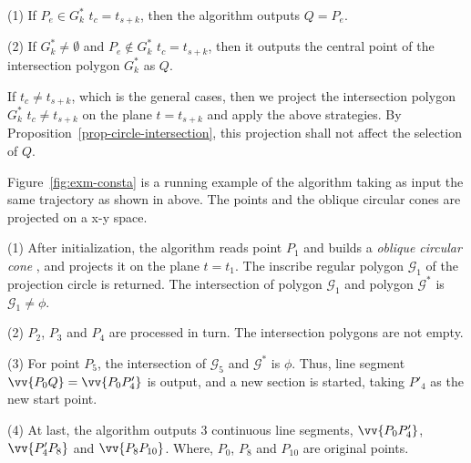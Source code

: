 \sstab (1) If $P_e \in G^*_k$ \wrt $t_c=t_{s+k}$, then the algorithm outputs $Q=P_e$.

\sstab (2) If $G^*_k \ne \emptyset$ and $P_e \not\in G^*_k$ \wrt $t_c=t_{s+k}$, then it outputs the central point of the intersection polygon $G^*_k$ as $Q$.

  If $t_c \ne t_{s+k}$, which is the general cases, then we project the intersection polygon $G^*_k$ \wrt $t_c \ne t_{s+k}$ on the plane $t=t_{s+k}$ and apply the above strategies. By Proposition~\ref{prop-circle-intersection}, this projection shall not affect the selection of $Q$.

\begin{example}
\label{exm-alg-conesta}
Figure~\ref{fig:exm-consta} is a running example of the \cista algorithm taking as input the same trajectory as shown in above.
The points and the oblique circular cones are projected on a x-y space.

\ni (1) After initialization, the \cista algorithm reads point $P_1$ and builds a \emph{oblique circular cone} , and projects it on the plane $t=t_1$. The inscribe regular polygon $\mathcal{G}_1$ of the projection circle is returned. The intersection of polygon $\mathcal{G}_1$ and polygon $\mathcal{G}^*$ is $\mathcal{G}_1 \ne \phi$.

\ni (2) $P_2$, $P_3$ and $P_4$ are processed in turn. The intersection polygons are not empty.

\ni (3) For point $P_5$, the intersection of $\mathcal{G}_5$ and $\mathcal{G}^*$ is $\phi$. Thus, line segment $\vv{P_0Q} =\vv{P_0P'_4}$ is output, and a new section is started, taking $P'_4$ as the new start point.

\ni (4) At last, the algorithm outputs 3 continuous line segments, \ie $\vv{P_0P'_4}$, $\vv{P'_4P_8}$ and $\vv{P_8P_{10}}$. Where, $P_0$, $P_8$ and $P_{10}$ are original points.
\end{example}








